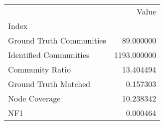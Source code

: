 \begin{tabular}{lr}
\toprule
{} &        Value \\
Index                    &              \\
\midrule
Ground Truth Communities &    89.000000 \\
Identified Communities   &  1193.000000 \\
Community Ratio          &    13.404494 \\
Ground Truth Matched     &     0.157303 \\
Node Coverage            &    10.238342 \\
NF1                      &     0.000464 \\
\bottomrule
\end{tabular}
